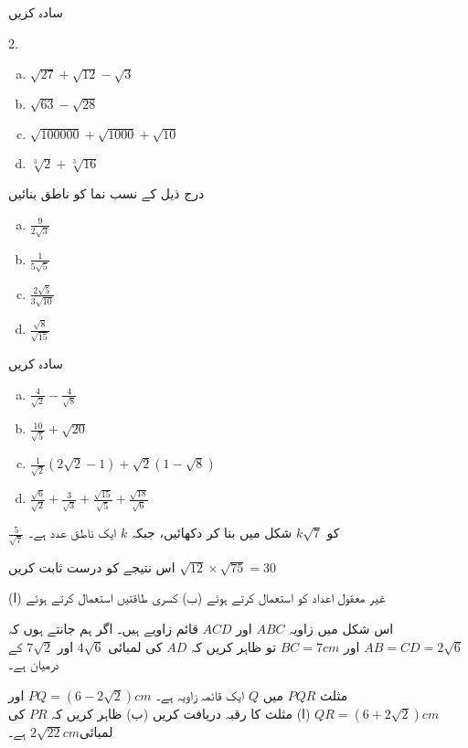 سادہ کریں
\begin{multicols}{2.}
\begin{enumerate}[a.]
\item
\(\sqrt{27}+\sqrt{12}-\sqrt{3}\)
\item
\(\sqrt{63}-\sqrt{28}\)
\item
\(\sqrt{\num{100000}}+\sqrt{1000}+\sqrt{10}\)
\item
\(\sqrt[3]{2}+\sqrt[3]{16}\)
\end{enumerate}
\end{multicols}
درج ذیل کے نسب نما کو ناطق بنائیں
\begin{multicols}{4}
\begin{enumerate}[a.]
\item
\(\frac{9}{2\sqrt{3}}\)
\item
\(\frac{1}{5\sqrt{5}}\)
\item
\(\frac{2\sqrt{5}}{3\sqrt{10}}\)
\item
\(\frac{\sqrt{8}}{\sqrt{15}}\)
\end{enumerate}
\end{multicols}
سادہ کریں
\begin{multicols}{2}
\begin{enumerate}[a.]
\item
\(\frac{4}{\sqrt{2}}-\frac{4}{\sqrt{8}}\)
\item
\(\frac{10}{\sqrt{5}}+\sqrt{20}\)
\item
\(\frac{1}{\sqrt{2}}(2\sqrt{2}-1)+\sqrt{2}(1-\sqrt{8})\)
\item
\(\frac{\sqrt{6}}{\sqrt{2}}+\frac{3}{\sqrt{3}}+\frac{\sqrt{15}}{\sqrt{5}}+\frac{\sqrt{18}}{\sqrt{6}}\)
\end{enumerate}
\end{multicols}
\(\frac{5}{\sqrt{7}}\) کو \(k\sqrt{7}\) شکل میں بنا کر دکھائیں، جبکہ \(k\) ایک ناطق عدد ہے۔

اس نتیجے کو درست ثابت کریں \(\sqrt{12}\times\sqrt{75}=30\)

(ا) غیر معقول اعداد کو استعمال کرتے ہوئے
(ب) کسری طاقتیں استعمال کرتے ہوئے

اس شکل میں زاویہ \(ABC\) اور \(ACD\) قائم زاویے ہیں۔
اگر ہم جانتے ہوں کہ \(AB=CD=2\sqrt{6}\) اور \(BC=7cm\) تو ظاہر کریں کہ \(AD\) کی لمبائی \(4\sqrt{6}\) اور \(7\sqrt{2}\) کے درمیان ہے۔

مثلث \(PQR\) میں \(Q\) ایک قائمہ زاویہ ہے۔ \(PQ=(6-2\sqrt{2})cm\) اور \(QR=(6+2\sqrt{2})cm\)
(ا) مثلث کا رقبہ دریافت کریں
(ب) ظاہر کریں کہ \(PR\) کی لمبائی\(2\sqrt{22}cm\) ہے۔

